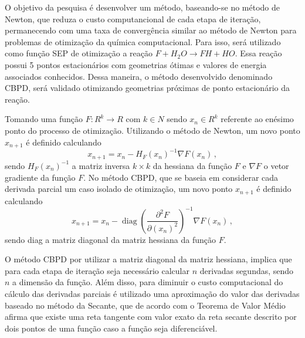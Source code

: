 \documentclass{pssbmac}
\DeclareMathOperator{\diag}{diag} %
\begin{document}
O objetivo da pesquisa é desenvolver um método, baseando-se no método de Newton, que reduza o custo computancional de cada etapa de iteração, permanecendo com uma taxa de convergência similar ao método de Newton para problemas de otimização da química computacional. Para isso, será utilizado como função SEP\cite{fh2o_sep_fortran_module} de otimização a reação $F + H_2O \to FH + HO$. Essa reação possui 5 pontos estacionários com geometrias ótimas e valores de energia associados conhecidos\cite{fh2o_first_sep}. Dessa maneira, o método desenvolvido denominado CBPD, será validado otimizando geometrias próximas de ponto estacionário da reação.

Tomando uma função $F: R^k \to R$ com $k \in N$ sendo $x_n \in R^k$ referente ao enésimo ponto do processo de otimização. Utilizando o método de Newton, um novo ponto $x_{n+1}$ é definido calculando
%
\begin{equation}
  x_{n+1} = x_n - H_F(x_n)^{-1} \nabla F(x_n) \,,
\end{equation}
%
sendo $H_F(x_n)^{-1}$ a matriz inversa $k \times k$ da hessiana da função $F$ e $\nabla F$ o vetor gradiente da função $F$.
No método CBPD, que se baseia em considerar cada derivada parcial um caso isolado de otimização, um novo ponto $x_{n+1}$ é definido calculando
%
\begin{equation}
  x_{n+1} = x_n - \diag{\left(\frac{\partial^2 F}{\partial (x_{n})^2 }\right)}^{-1} \nabla F(x_n) \,,
\end{equation}
%
sendo diag a matriz diagonal da matriz hessiana da função $F$.

O método CBPD por utilizar a matriz diagonal da matriz hessiana, implica que para cada etapa de iteração seja necessário calcular $n$ derivadas segundas, sendo $n$ a dimensão da função. Além disso, para diminuir o custo computacional do cálculo das derivadas parciais é utilizado uma aproximação do valor das derivadas baseado no método da Secante, que de acordo com o Teorema de Valor Médio\cite{calculo_1} afirma que existe uma reta tangente com valor exato da reta secante descrito por dois pontos de uma função caso a função seja diferenciável.
\end{document}
